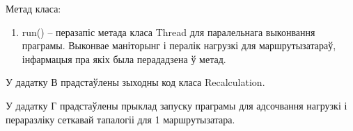 Метад класа:
\begin{enumerate}
    \item run() -- перазапіс метада класа Thread для паралельнага выконвання праграмы. Выконвае маніторынг і пералік нагрузкі для маршрутызатараў, інфармацыя пра якіх была перададзена ў метад.
\end{enumerate}

У дадатку В прадстаўлены зыходны код класа Recalculation.

%

У дадатку Г прадстаўлены прыклад запуску праграмы для адсочвання
нагрузкі і пераразліку сеткавай тапалогіі для 1 маршрутызатара.

%

